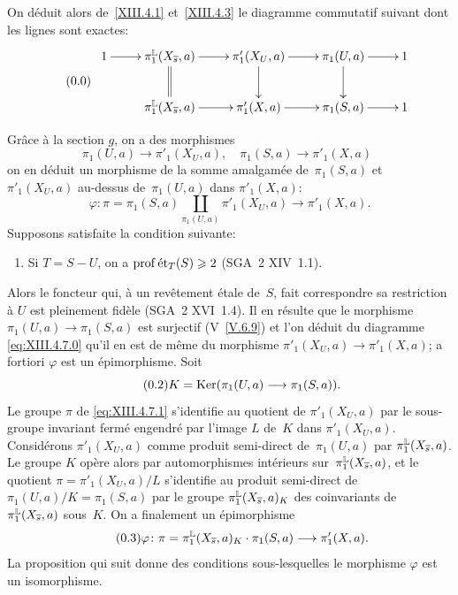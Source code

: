 On d\'eduit alors de~\ref{XIII.4.1} et~\ref{XIII.4.3} le diagramme
commutatif suivant dont les lignes sont exactes:
\begin{equation*}
\label{eq:XIII.4.7.0} \tag{\thesubsection.0} {}
\begin{array}{c}
\xymatrix{{1}\ar[r]&{\pi_1^{\LL}(X_{\bar{s}},a)}\ar[r]\ar@{=}[d]&{\pi'_1(X_U,a)}\ar[r]\ar[d]&{\pi_1(U,a)}\ar[r]\ar[d]&{1}\\
&{\pi_1^{\LL}(X_{\bar{s}},a)}\ar[r]&{\pi'_1(X,a)}\ar[r]&{\pi_1(S,a)}\ar[r]&{1}}
\end{array}
\end{equation*}

Gr\^ace \`a la section $g$, on a des morphismes
$$\pi_1(U,a)\to\pi'_1(X_U,a),\quad \pi_1(S,a)\to\pi'_1(X,a)\,\;$$
on en
d\'eduit un morphisme de la somme amalgam\'ee de~$\pi_1(S,a)$ et
$\pi'_1(X_U,a)$ au-dessus de~$\pi_1(U,a)$ dans $\pi'_1(X,a)$:
\begin{equation*}
\label{eq:XIII.4.7.1} \tag{\thesubsection.1} {}
\varphi\colon\pi=\pi_1(S,a)\coprod_{\pi_1(U,a)}\pi'_1(X_U,a)\to\pi'_1(X,a).
\end{equation*}
Supposons satisfaite la condition suivante:
\begin{enumerate}
\item[c)] Si $T=S-U$, on a $\operatorname{prof} \mathrm{\acute{e}t}_T(S)\geqslant 2$ (SGA~2 XIV~1.1).
\end{enumerate}
Alors le foncteur qui, \`a un rev\^etement \'etale de~$S$, fait
correspondre sa restriction \`a $U$ est pleinement fid\`ele
(SGA~2 XVI~1.4). Il en r\'esulte que le morphisme
$\pi_1(U,a)\to\pi_1(S,a)$ est surjectif (V~\ref{V.6.9}) et l'on
d\'eduit du
diagramme \eqref{eq:XIII.4.7.0} qu'il en est de m\^eme du morphisme
$\pi'_1(X_U,a)\to\pi'_1(X,a)$; a fortiori $\varphi$ est un
\'epimorphisme. Soit
\begin{equation*}
\label{eq:XIII.4.7.2} \tag{\thesubsection.2} {}
K=\Ker(\pi_1(U,a)\to\pi_1(S,a)).
\end{equation*}
Le groupe $\pi$ de \eqref{eq:XIII.4.7.1} s'identifie au quotient de
$\pi'_1(X_U,a)$ par le sous-groupe invariant ferm\'e engendr\'e
par l'image $L$ de~$K$ dans $\pi'_1(X_U,a)$. Consid\'erons
$\pi'_1(X_U,a)$ comme produit semi-direct de~$\pi_1(U,a)$ par
$\pi_1^{\mathbb{L}} (X_{\overline{s}},a)$. Le groupe $K$ op\`ere alors par
automorphismes int\'erieurs sur~$\pi_1^{\mathbb{L}} (X_{\overline{s}},a)$, et le
quotient $\pi=\pi'_1(X_U,a)/L$ s'identifie au produit semi-direct de
$\pi_1(U,a)/K=\pi_1(S,a)$ par le groupe $\pi_1^{\mathbb{L}}(X_{\overline{s}},a)_K$
des coinvariants de~$\pi_1^{\mathbb{L}}(X_{\overline{s}},a)$ sous~$K$. On a
finalement un \'epimorphisme
\begin{equation*}
\label{eq:XIII.4.7.3} \tag{\thesubsection.3} {}
\varphi\colon\pi=\pi_1^\LL(X_{\bar{s}},a)_K\cdot\pi_1(S,a)\to\pi'_1(X,a).
\end{equation*}
\label{indnot:ml}
La proposition qui suit donne des conditions sous-lesquelles le
morphisme $\varphi$ est un isomorphisme.

